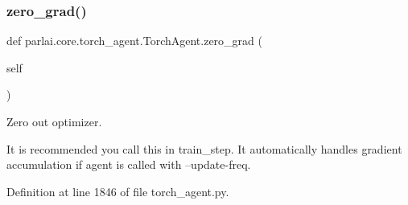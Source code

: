 \mbox{\label{classparlai_1_1core_1_1torch__agent_1_1TorchAgent_a91c163f3e2d39b380095b7083f673b6e}} 
\subsubsection{\texorpdfstring{zero\+\_\+grad()}{zero\_grad()}}
{\footnotesize\ttfamily def parlai.\+core.\+torch\+\_\+agent.\+Torch\+Agent.\+zero\+\_\+grad (\begin{DoxyParamCaption}\item[{}]{self }\end{DoxyParamCaption})}

\begin{DoxyVerb}Zero out optimizer.

It is recommended you call this in train_step. It automatically handles
gradient accumulation if agent is called with --update-freq.
\end{DoxyVerb}
 

Definition at line 1846 of file torch\+\_\+agent.\+py.



